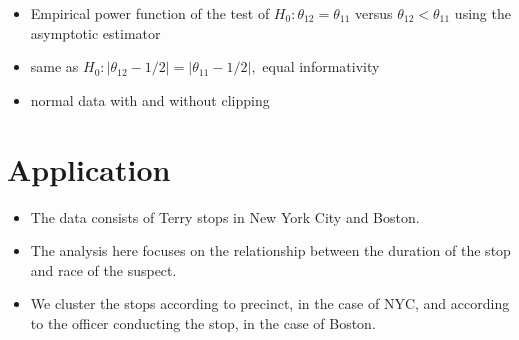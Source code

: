 \documentclass{beamer}
\newcommand{\cind}{\perp \!\!\! \perp}
\newcommand{\aucindiv}{\theta_{11}}%
\newcommand{\aucpop}{\theta_{12}}%
\begin{document}
\begin{frame}
  \begin{itemize}
\item Empirical power function of the test of $H_0:\aucpop=\aucindiv$ versus $\aucpop<\aucindiv$ using the
asymptotic estimator
\item  same as $H_0:|\aucpop-1/2|=|\aucindiv-1/2|,$ equal informativity
  \item normal data with and without clipping
\end{itemize}
\begin{figure}%
  \centering
  \hfill
\end{figure}
\end{frame}


\section{Application}
\begin{frame}
  \begin{itemize}
  \item  The data consists of Terry stops in New York City and Boston.
  \item The analysis here focuses on the relationship between the duration of the
    stop and race of the suspect.
  \item We cluster the stops according to
    precinct, in the case of NYC, and according to the officer conducting
    the stop, in the case of Boston.
  \end{itemize}
\end{frame}
\end{document}
